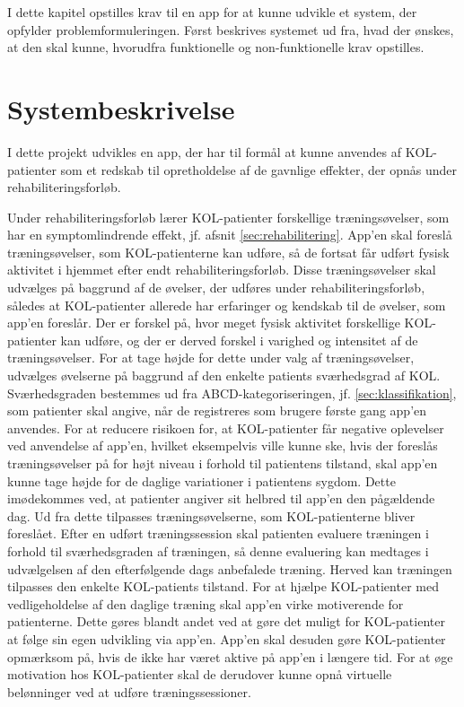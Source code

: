 I dette kapitel opstilles krav til en app for at kunne udvikle et system, der opfylder problemformuleringen. Først beskrives systemet ud fra, hvad der ønskes, at den skal kunne, hvorudfra funktionelle og non-funktionelle krav opstilles.

\section{Systembeskrivelse} \label{sec:systembeskrivelse}
I dette projekt udvikles en app, der har til formål at kunne anvendes af KOL-patienter som et redskab til opretholdelse af de gavnlige effekter, der opnås under rehabiliteringsforløb.

Under rehabiliteringsforløb lærer KOL-patienter forskellige træningsøvelser, som har en symptomlindrende effekt, jf. afsnit \ref{sec:rehabilitering}. App’en skal foreslå træningsøvelser, som KOL-patienterne kan udføre, så de fortsat får udført fysisk aktivitet i hjemmet efter endt rehabiliteringsforløb. Disse træningsøvelser skal udvælges på baggrund af de øvelser, der udføres under rehabiliteringsforløb, således at KOL-patienter allerede har erfaringer og kendskab til de øvelser, som app’en foreslår.
Der er forskel på, hvor meget fysisk aktivitet forskellige KOL-patienter kan udføre, og der er derved forskel i varighed og intensitet af de træningsøvelser. For at tage højde for dette under valg af træningsøvelser, udvælges øvelserne på baggrund af den enkelte patients sværhedsgrad af KOL. Sværhedsgraden bestemmes ud fra ABCD-kategoriseringen, jf. \ref{sec:klassifikation}, som patienter skal angive, når de registreres som brugere første gang app'en anvendes. 
For at reducere risikoen for, at KOL-patienter får negative oplevelser ved anvendelse af app’en, hvilket eksempelvis ville kunne ske, hvis der foreslås træningsøvelser på for højt niveau i forhold til patientens tilstand, skal app’en kunne tage højde for de daglige variationer i patientens sygdom. Dette imødekommes ved, at patienter angiver sit helbred til app'en den pågældende dag.
Ud fra dette tilpasses træningsøvelserne, som KOL-patienterne bliver foreslået. Efter en udført
træningssession skal patienten evaluere træningen i forhold til sværhedsgraden af træningen,
så denne evaluering kan medtages i udvælgelsen af den efterfølgende dags anbefalede træning. Herved kan træningen tilpasses den enkelte KOL-patients tilstand.
For at hjælpe KOL-patienter med vedligeholdelse af den daglige træning skal app’en virke motiverende for patienterne. Dette gøres blandt andet ved at gøre det muligt for KOL-patienter at følge sin egen udvikling via app’en. App’en skal desuden gøre KOL-patienter opmærksom på, hvis de ikke har været aktive på app'en i længere tid. For at øge motivation hos KOL-patienter skal de derudover kunne opnå virtuelle belønninger ved at udføre træningssessioner.

